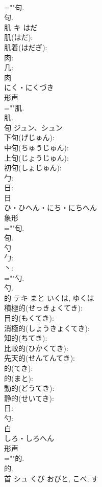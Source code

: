 \documentclass[8pt]{extreport}
\begin{document}
\begin{CJK}{UTF8}{min}
\\	=""句.
\\	句.
\\	肌	キ	はだ		
\\	肌(はだ): 
\\	肌着(はだぎ): 
\\	肉: 
\\	几: 
\\	肉	
\\	にく・にくづき	
\\	形声 
\\	=""肌.
\\	肌.
\\	旬	ジュン、シュン			
\\	下旬(げじゅん): 
\\	中旬(ちゅうじゅん): 
\\	上旬(じょうじゅん): 
\\	初旬(しょじゅん): 
\\	勹: 
\\	日: 
\\	日	
\\	ひ・ひへん・にち・にちへん	
\\	象形 
\\	=""旬.
\\	旬.
\\	勺						
\\	勹: 
\\	丶: 
\\	=""勺.
\\	勺.
\\	的	テキ	まと	いくは, ゆくは	
\\	積極的(せっきょくてき): 
\\	目的(もくてき): 
\\	消極的(しょうきょくてき): 
\\	知的(ちてき): 
\\	比較的(ひかくてき): 
\\	先天的(せんてんてき): 
\\	的(てき): 
\\	的(まと): 
\\	動的(どうてき): 
\\	静的(せいてき): 
\\	日: 
\\	勺: 
\\	白	
\\	しろ・しろへん	
\\	形声 
\\	=""的.
\\	的.
\\	首	シュ	くび	おびと, こべ, す	

\end{CJK}
\end{document}
